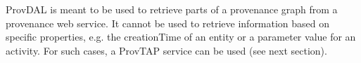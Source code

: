 ProvDAL is meant to be used to retrieve parts of a provenance graph from a provenance web service. It cannot be used to retrieve information based on specific properties, e.g. the creationTime of an entity or a parameter value for an activity. For such cases, a ProvTAP service can be used (see next section).


